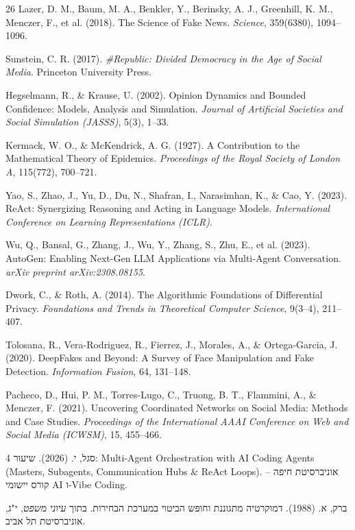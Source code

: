 \begin{thebibliography}{26}
Lazer, D. M., Baum, M. A., Benkler, Y., Berinsky, A. J., Greenhill, K. M., Menczer, F., et al. (2018). The Science of Fake News. \emph{Science}, 359(6380), 1094--1096.

Sunstein, C. R. (2017). \emph{\#Republic: Divided Democracy in the Age of Social Media}. Princeton University Press.

Hegselmann, R., \& Krause, U. (2002). Opinion Dynamics and Bounded Confidence: Models, Analysis and Simulation. \emph{Journal of Artificial Societies and Social Simulation (JASSS)}, 5(3), 1--33.

Kermack, W. O., \& McKendrick, A. G. (1927). A Contribution to the Mathematical Theory of Epidemics. \emph{Proceedings of the Royal Society of London A}, 115(772), 700--721.

Yao, S., Zhao, J., Yu, D., Du, N., Shafran, I., Narasimhan, K., \& Cao, Y. (2023). ReAct: Synergizing Reasoning and Acting in Language Models. \emph{International Conference on Learning Representations (ICLR)}.

Wu, Q., Bansal, G., Zhang, J., Wu, Y., Zhang, S., Zhu, E., et al. (2023). AutoGen: Enabling Next-Gen LLM Applications via Multi-Agent Conversation. \emph{arXiv preprint arXiv:2308.08155}.

Dwork, C., \& Roth, A. (2014). The Algorithmic Foundations of Differential Privacy. \emph{Foundations and Trends in Theoretical Computer Science}, 9(3--4), 211--407.

Tolosana, R., Vera-Rodriguez, R., Fierrez, J., Morales, A., \& Ortega-Garcia, J. (2020). DeepFakes and Beyond: A Survey of Face Manipulation and Fake Detection. \emph{Information Fusion}, 64, 131--148.

Pacheco, D., Hui, P. M., Torres-Lugo, C., Truong, B. T., Flammini, A., \& Menczer, F. (2021). Uncovering Coordinated Networks on Social Media: Methods and Case Studies. \emph{Proceedings of the International AAAI Conference on Web and Social Media (ICWSM)}, 15, 455--466.

סגל, י. (2026). שיעור 4: Multi-Agent Orchestration with AI Coding Agents (Masters, Subagents, Communication Hubs \& ReAct Loops). אוניברסיטת חיפה -- קורס יישומי AI ו-Vibe Coding.

ברק, א. (1988). דמוקרטיה מתגוננת וחופש הביטוי במערכת הבחירות. בתוך \emph{עיוני משפט}, י"ג, אוניברסיטת תל אביב.


\end{thebibliography}
